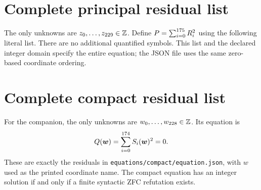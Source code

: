 \documentclass[11pt]{article}
\theoremstyle{remark}\newtheorem{remark}[theorem]{Remark}
\newcommand{\Z}{\mathbb Z}\newcommand{\N}{\mathbb N}
\begin{document}
\clearpage\appendix
\section{Complete principal residual list}\label{app:residuals}

The only unknowns are $z_0,\ldots,z_{\MainLastVar}\in\Z$.
Define $P=\sum_{i=0}^{175}R_i^2$ using the following
literal list. There are no additional quantified symbols. This list
and the declared integer domain specify the entire equation; the
JSON file uses the same zero-based coordinate ordering.


\clearpage
\section{Complete compact residual list}\label{app:compact}

For the companion, the only unknowns are
$w_0,\ldots,w_{\CompactLastVar}\in\Z$. Its equation is
\[
 Q(\boldsymbol w)=\sum_{i=0}^{174}S_i(\boldsymbol w)^2=0.
\]
These are exactly the residuals in
\nolinkurl{equations/compact/equation.json}, with $w$ used as the
printed coordinate name. The compact equation has an integer solution
if and only if a finite syntactic ZFC refutation exists.


\end{document}
